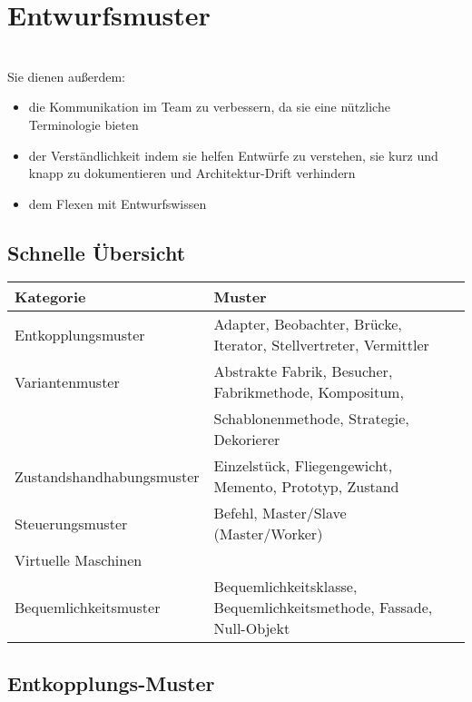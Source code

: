 \section{Entwurfsmuster}
\\
Sie dienen außerdem:
\begin{itemize}
    \item die Kommunikation im Team zu verbessern, da sie eine nützliche Terminologie bieten
    \item der Verständlichkeit indem sie helfen Entwürfe zu verstehen, sie kurz und knapp zu dokumentieren und Architektur-Drift verhindern
    \item dem Flexen mit Entwurfswissen
\end{itemize}

\subsection{Schnelle Übersicht}
\begin{table}[h]
\begin{tabular}{l|l}
Kategorie & Muster   \\\hline
Entkopplungsmuster & Adapter, Beobachter, Brücke, Iterator, Stellvertreter, Vermittler  \\
Variantenmuster & Abstrakte Fabrik, Besucher, Fabrikmethode, Kompositum, \\& Schablonenmethode, Strategie, Dekorierer \\
Zustandshandhabungsmuster & Einzelstück, Fliegengewicht, Memento, Prototyp, Zustand  \\
Steuerungsmuster & Befehl, Master/Slave (Master/Worker)  \\
Virtuelle Maschinen &   \\
Bequemlichkeitsmuster & Bequemlichkeitsklasse, Bequemlichkeitsmethode, Fassade, Null-Objekt 
\end{tabular}
\end{table}
\newpage
\subsection{Entkopplungs-Muster}
